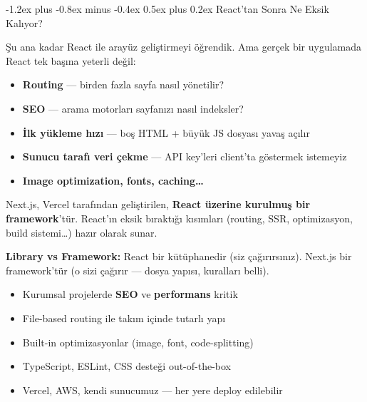 \documentclass[12pt, a4paper]{article}
\makeatletter
\renewcommand{\subsection}{%
  \@startsection{subsection}{2}{\z@}%
    {-1.2ex plus -0.8ex minus -0.4ex}%
    {0.5ex plus 0.2ex}%
    {\normalfont\large\bfseries\sffamily\color{secondary}}%
}
\makeatother
\begin{document}
\subsection{React'tan Sonra Ne Eksik Kalıyor?}

Şu ana kadar React ile arayüz geliştirmeyi öğrendik. Ama gerçek bir
uygulamada React tek başına yeterli değil:

\begin{itemize}
  \item \textbf{Routing} --- birden fazla sayfa nasıl yönetilir?
  \item \textbf{SEO} --- arama motorları sayfanızı nasıl indeksler?
  \item \textbf{İlk yükleme hızı} --- boş HTML + büyük JS dosyası yavaş açılır
  \item \textbf{Sunucu tarafı veri çekme} --- API key'leri client'ta göstermek istemeyiz
  \item \textbf{Image optimization, fonts, caching\ldots}
\end{itemize}

\vspace{6pt}

\begin{definebox}
Next.js, Vercel tarafından geliştirilen, \textbf{React üzerine kurulmuş
bir framework}'tür. React'ın eksik bıraktığı kısımları (routing, SSR,
optimizasyon, build sistemi\ldots) hazır olarak sunar.

\vspace{4pt}
\textbf{Library vs Framework:} React bir kütüphanedir (siz çağırırsınız).
Next.js bir framework'tür (o sizi çağırır --- dosya yapısı, kuralları belli).
\end{definebox}

\vspace{6pt}

\begin{infobox}
\begin{itemize}
  \item Kurumsal projelerde \textbf{SEO} ve \textbf{performans} kritik
  \item File-based routing ile takım içinde tutarlı yapı
  \item Built-in optimizasyonlar (image, font, code-splitting)
  \item TypeScript, ESLint, CSS desteği out-of-the-box
  \item Vercel, AWS, kendi sunucumuz --- her yere deploy edilebilir
\end{itemize}
\end{infobox}
\end{document}
